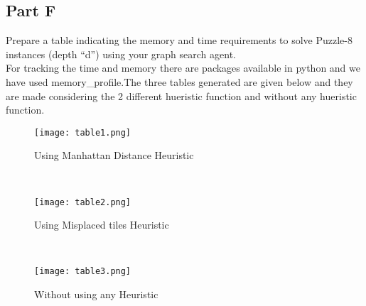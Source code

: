\documentclass[conference]{IEEEtran}
\begin{document}
\subsection{Part F}
\newline
Prepare a table indicating the memory and time requirements to solve Puzzle-8 instances (depth “d”) using your graph search agent.
\\
For tracking the time and memory there are packages available in python and we have used memory\_profile.The three tables generated are given below and they are made considering the 2 different hueristic function and without any hueristic function.

\begin{figure}
\centerline{\texttt{[image: table1.png]}}
{        Using Manhattan Distance Heuristic}

\end{figure}
\\

\begin{figure}
\centerline{\texttt{[image: table2.png]}}
{        Using Misplaced tiles Heuristic}

\end{figure}
\\

\begin{figure}
\centerline{\texttt{[image: table3.png]}}
{        Without using any Heuristic}

\end{figure}
\end{document}
